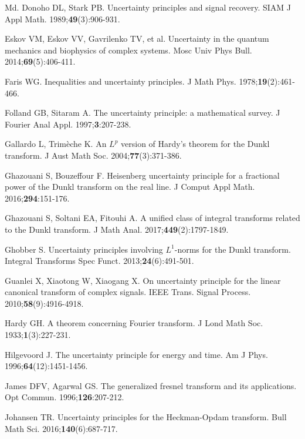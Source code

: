 \documentclass[12pt,a4paper,reqno]{amsproc}
\theoremstyle{definition}
\theoremstyle{remark}
\numberwithin{equation}{section}
\begin{document}
\begin{thebibliography}{Md.}
 Donoho DL,   Stark PB. Uncertainty principles and signal recovery. SIAM J Appl Math. 1989;{\bf{49}}(3):906-931.

 Eskov VM, 
  Eskov VV,  Gavrilenko TV,  et al.  Uncertainty in the quantum mechanics and biophysics of complex systems. Mosc Univ Phys Bull. 2014;\textbf{69}(5):406-411.
  
 Faris WG. Inequalities and uncertainty principles. J Math Phys. 1978;\textbf{19}(2):461-466.

  Folland GB,   Sitaram A.  The uncertainty principle: a mathematical survey. J Fourier Anal Appl. 1997;\textbf{3}:207-238.

Gallardo L,  Trimèche K.  An $L^p$ version of Hardy's theorem for the Dunkl transform. J Aust Math Soc. 2004;\textbf{77}(3):371-386.

 Ghazouani S,  Bouzeffour F. Heisenberg uncertainty principle for a fractional power of the Dunkl transform on the real line. J Comput Appl Math. 2016;\textbf{294}:151-176.

 Ghazouani S,  Soltani EA, Fitouhi A.  A unified class of integral transforms related to the Dunkl transform. J Math Anal. 2017;{\bf{449}}(2):1797-1849.

 Ghobber S. Uncertainty principles involving $L^1$-norms for the Dunkl transform. Integral
Transforms Spec Funct. 2013;{\bf{24}}(6):491-501.

 Guanlei X, Xiaotong W, Xiaogang X. On uncertainty principle for the linear canonical transform of complex signals. IEEE Trans. Signal Process. 2010;\textbf{58}(9):4916-4918.

 Hardy GH. A theorem concerning Fourier transform. J Lond Math Soc. 1933;{\bf{1}}(3):227-231.

 Hilgevoord J. The uncertainty principle for energy and time. Am J Phys. 1996;\textbf{64}(12):1451-1456.

 James DFV,  Agarwal GS. The generalized fresnel transform and its applications. Opt Commun. 1996;\textbf{126}:207-212.

Johansen TR. Uncertainty principles for the Heckman-Opdam transform. Bull Math Sci. 2016;\textbf{140}(6):687-717.


\end{thebibliography}
\end{document}
